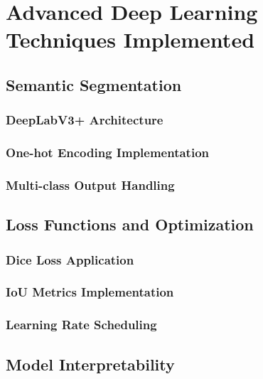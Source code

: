 \documentclass[12pt,a4paper]{report}
\begin{document}
\section{Advanced Deep Learning Techniques Implemented}

\subsection{Semantic Segmentation}

\subsubsection{DeepLabV3+ Architecture}

\subsubsection{One-hot Encoding Implementation}

\subsubsection{Multi-class Output Handling}

\subsection{Loss Functions and Optimization}

\subsubsection{Dice Loss Application}

\subsubsection{IoU Metrics Implementation}

\subsubsection{Learning Rate Scheduling}

\subsection{Model Interpretability}
\end{document}
